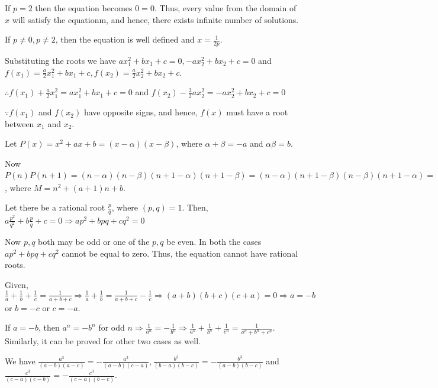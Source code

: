   If $p = 2$ then the equation becomes $0 = 0$. Thus, every value from the domain of $x$ will satisfy the
  equationm, and hence, there exists infinite number of solutions.

  If $p\neq 0, p\neq 2$, then the equation is well defined and $x = \frac{1}{2p}$.
\item Substituting the roots we have $ax_1^2 + bx_1 + c = 0, -ax_2^2 + bx_2 + c = 0$ and $f(x_1) =
  \frac{a}{2}x_1^2 + bx_1 + c, f(x_2) = \frac{a}{2}x_2^2 + bx_2 + c$.

  $\therefore f(x_1) + \frac{a}{2}x_1^2 = ax_1^2 + bx_1 + c = 0$ and $f(x_2) - \frac{3}{2}ax_2^2 = -ax_2^2
  + bx_2 + c = 0$

  $\because f(x_1)$ and $f(x_2)$ have opposite signs, and hence, $f(x)$ must have a root between $x_1$ and
  $x_2$.
\item Let $P(x) = x^2 + ax + b = (x - \alpha)(x - \beta)$, where $\alpha + \beta = -a$ and $\alpha\beta =
  b$.

  Now $P(n)P(n + 1) = (n - \alpha)(n - \beta)(n + 1 - \alpha)(n + 1 - \beta) = (n - \alpha)(n + 1 - \beta)(n
  - \beta)(n + 1 - \alpha) = [n^2 - (\alpha + \beta - 1)n + \alpha\beta - \alpha][n^2 + (\alpha + \beta -
    1)n + \alpha\beta - b] = [n^2  + (a + 1)n + b - \alpha][n^2 + (a + 1)n + b - \beta] = (M - \alpha)(M -
  \beta)$, where $M = n^2 + (a + 1)n + b$.
\item Let there be a rational root $\frac{p}{q}$, where $(p, q) = 1$. Then, $a\frac{p^2}{q^2} + b\frac{p}{q}
  + c = 0 \Rightarrow ap^2 + bpq + cq^2 = 0$

  Now $p, q$ both may be odd or one of the $p, q$ be even. In both the cases $ap^2 + bpq + cq^2$ cannot be
  equal to zero. Thus, the equation cannot have rational roots.
\item Given, $\frac{1}{a} + \frac{1}{b} + \frac{1}{c} = \frac{1}{a + b + c} \Rightarrow \frac{1}{a} +
  \frac{1}{b} = \frac{1}{a + b + c} - \frac{1}{c}\Rightarrow (a + b)(b + c)(c + a) = 0\Rightarrow a = -b$ or
  $b = - c$ or $c = -a$.

  If $a = -b$, then $a^n = -b^n$ for odd $n \Rightarrow \frac{1}{a^n} = - \frac{1}{b^n}\Rightarrow
  \frac{1}{a^n} + \frac{1}{b^n} + \frac{1}{c^n} = \frac{1}{a^n + b^n + c^n}$. Similarly, it can be proved
  for other two cases as well.
\item We have $\frac{a^3}{(a - b)(a - c)} = -\frac{a^3}{(a - b)(c - a)}, \frac{b^3}{(b - a)(b - c)} =
  -\frac{b^3}{(a - b)(b - c)}$ and $\frac{c^3}{(c - a)(c - b)} = -\frac{c^3}{(c - a)(b - c)}$.


